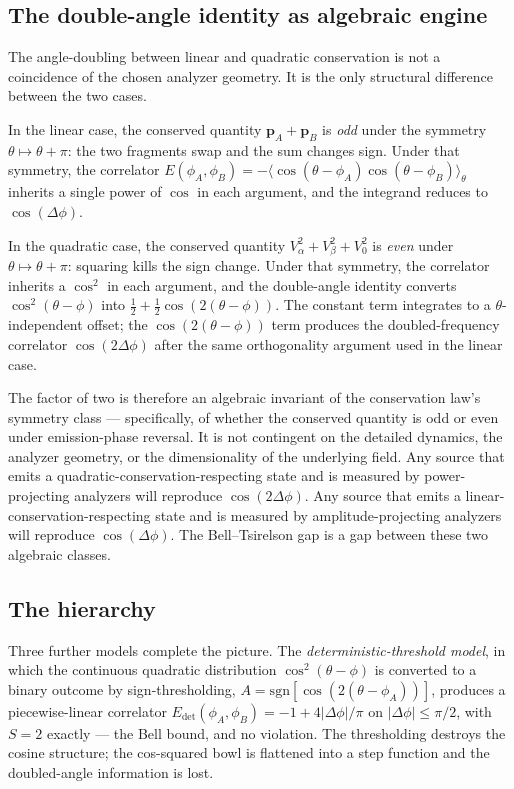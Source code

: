 \documentclass[
  11pt]{article}
\begin{document}
\subsection{The double-angle identity as algebraic
engine}\label{the-double-angle-identity-as-algebraic-engine}

The angle-doubling between linear and quadratic conservation is not a
coincidence of the chosen analyzer geometry. It is the only structural
difference between the two cases.

In the linear case, the conserved quantity
\(\mathbf{p}_A + \mathbf{p}_B\) is \emph{odd} under the symmetry
\(\theta \mapsto \theta + \pi\): the two fragments swap and the sum
changes sign. Under that symmetry, the correlator
\(E(\phi_A, \phi_B) = -\langle \cos(\theta - \phi_A)\cos(\theta - \phi_B)\rangle_\theta\)
inherits a single power of \(\cos\) in each argument, and the integrand
reduces to \(\cos(\Delta\phi)\).

In the quadratic case, the conserved quantity
\(V_\alpha^2 + V_\beta^2 + V_0^2\) is \emph{even} under
\(\theta \mapsto \theta + \pi\): squaring kills the sign change. Under
that symmetry, the correlator inherits a \(\cos^2\) in each argument,
and the double-angle identity converts \(\cos^2(\theta - \phi)\) into
\(\tfrac{1}{2} + \tfrac{1}{2}\cos(2(\theta - \phi))\). The constant term
integrates to a \(\theta\)-independent offset; the
\(\cos(2(\theta - \phi))\) term produces the doubled-frequency
correlator \(\cos(2\Delta\phi)\) after the same orthogonality argument
used in the linear case.

The factor of two is therefore an algebraic invariant of the
conservation law's symmetry class --- specifically, of whether the
conserved quantity is odd or even under emission-phase reversal. It is
not contingent on the detailed dynamics, the analyzer geometry, or the
dimensionality of the underlying field. Any source that emits a
quadratic-conservation-respecting state and is measured by
power-projecting analyzers will reproduce \(\cos(2\Delta\phi)\). Any
source that emits a linear-conservation-respecting state and is measured
by amplitude-projecting analyzers will reproduce \(\cos(\Delta\phi)\).
The Bell--Tsirelson gap is a gap between these two algebraic classes.

\subsection{The hierarchy}\label{the-hierarchy}

Three further models complete the picture. The
\emph{deterministic-threshold model}, in which the continuous quadratic
distribution \(\cos^2(\theta - \phi)\) is converted to a binary outcome
by sign-thresholding, \(A = \mathrm{sgn}[\cos(2(\theta - \phi_A))]\),
produces a piecewise-linear correlator
\(E_\text{det}(\phi_A, \phi_B) = -1 + 4|\Delta\phi|/\pi\) on
\(|\Delta\phi| \leq \pi/2\), with \(S = 2\) exactly --- the Bell bound,
and no violation. The thresholding destroys the cosine structure; the
cos-squared bowl is flattened into a step function and the doubled-angle
information is lost.
\end{document}
